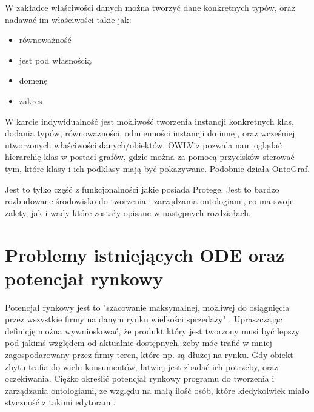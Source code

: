 \documentclass[a4paper,12pt, twoside]{book} %
\begin{document}
W zakładce właściwości danych można tworzyć dane konkretnych typów, oraz nadawać im właściwości takie jak:
\begin{itemize}
	\item równoważność
	\item jest pod własnością
	\item domenę 
	\item zakres
\end{itemize}
W karcie indywidualność jest możliwość tworzenia instancji konkretnych klas, dodania typów, równoważności, odmienności instancji do innej, oraz wcześniej utworzonych właściwości danych/obiektów.
OWLViz pozwala nam oglądać hierarchię klas w postaci grafów, gdzie można za pomocą przycisków sterować tym, które klasy i ich podklasy mają być pokazywane. Podobnie działa OntoGraf.

Jest to tylko część z funkcjonalności jakie posiada Protege. Jest to bardzo rozbudowane środowisko do tworzenia i zarządzania ontologiami, co ma swoje zalety, jak i wady które zostały opisane w następnych rozdziałach.

\section{Problemy istniejących ODE oraz potencjał rynkowy}
Potencjał rynkowy jest to "szacowanie maksymalnej, możliwej do osiągnięcia przez wszystkie firmy na danym rynku wielkości sprzedaży" \cite{Strategie}. Upraszczając definicję można wywnioskować, że produkt który jest tworzony musi być lepszy pod jakimś względem od aktualnie dostępnych, żeby móc trafić w mniej zagospodarowany przez firmy teren, które np. są dłużej na rynku. Gdy obiekt zbytu trafia do wielu konsumentów, łatwiej jest zbadać ich potrzeby, oraz oczekiwania. Ciężko określić potencjał rynkowy programu do tworzenia i zarządzania ontologiami, ze względu na małą ilość osób, które kiedykolwiek miało styczność z takimi edytorami.
\end{document}
